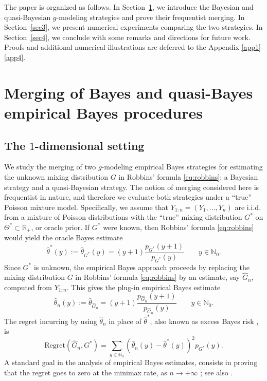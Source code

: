 \documentclass[twoside,12pt]{article}
\begin{document}
The paper is organized as follows. In Section~\ref{sec2}, we introduce the Bayesian and quasi-Bayesian $g$-modeling strategies and prove their frequentist merging. In Section~\ref{sec3}, we present numerical experiments comparing the two strategies. In Section~\ref{sec4}, we conclude with some remarks and directions for future work. Proofs and additional numerical illustrations are deferred to the Appendix \ref{app1}-\ref{app4}.


\section{Merging of Bayes and quasi-Bayes empirical Bayes procedures}\label{sec2}
\subsection{The $1$-dimensional setting}

We study the merging of two $g$-modeling empirical Bayes strategies for estimating the unknown mixing distribution $G$ in Robbins' formula \eqref{eq:robbins}: a Bayesian strategy and a quasi-Bayesian strategy. The notion of merging considered here is frequentist in nature, and therefore we evaluate both strategies under a ``true'' Poisson mixture model.  Specifically, we assume that $Y_{1:n}=(Y_{1},\ldots,Y_{n})$ are i.i.d. from a mixture of Poisson distributions with the ``true'' mixing distribution $G^{\ast}$ on $\Theta^{\ast}\subset\mathbb{R}_{+}$, or oracle prior. If $G^\ast$ were known, then Robbins' formula \eqref{eq:robbins} would yield the oracle Bayes estimate
\begin{equation}\label{eq:oracle}
\hat{\theta}^{\ast}(y):=\hat{\theta}_{G^{\ast}}(y)=(y+1)\frac{p_{G^{\ast}}(y+1)}{p_{G^{\ast}}(y)}\qquad  y\in\mathbb{N}_{0}.
\end{equation}
Since $G^{\ast}$ is unknown, the empirical Bayes approach proceeds by replacing the mixing distribution $G$ in Robbins' formula \eqref{eq:robbins} by an estimate, say $\hat G_n$, computed from $Y_{1:n}$. This gives the plug-in empirical Bayes estimate
\begin{equation}\label{eq:estimate}
\hat{\theta}_{n}(y):=\hat{\theta}_{\hat{G}_{n}}=(y+1)\frac{p_{\hat{G}_{n}}(y+1)}{p_{\hat{G}_{n}}(y)}\qquad  y\in\mathbb{N}_{0}.
\end{equation}
The regret incurring by using $\hat{\theta}_{n}$ in place of $\hat{\theta}^{\ast}$, also known as excess Bayes risk  \citep[Section 3]{Efr(19)}, is 
\begin{equation}\label{reg}
\text{Regret}(\hat{G}_n,G^*)=\sum_{y\in\mathbb{N}_{0}}(\hat\theta_{n}(y)-\hat\theta^{*}(y))^2p_{G^*}(y).
\end{equation}
A standard goal in the analysis of empirical Bayes estimates, consists in proving that the regret goes to zero at the minimax rate, as $n\rightarrow+\infty$ \citep{Pol(21)}; see also \citet{Efr(14),Efr(19)}.
\end{document}
